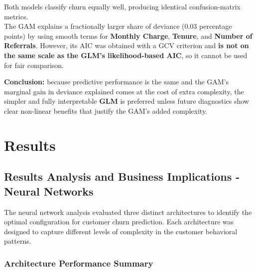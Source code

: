 \documentclass[
]{article}
\begin{document}
Both models classify churn equally well, producing identical
confusion-matrix metrics.\\
The GAM explains a fractionally larger share of deviance (0.03
percentage points) by using smooth terms for \textbf{Monthly Charge},
\textbf{Tenure}, and \textbf{Number of Referrals}. However, its AIC was
obtained with a GCV criterion and \textbf{is not on the same scale as
the GLM's likelihood-based AIC}, so it cannot be used for fair
comparison.

\textbf{Conclusion:} because predictive performance is the same and the
GAM's marginal gain in deviance explained comes at the cost of extra
complexity, the simpler and fully interpretable \textbf{GLM} is
preferred unless future diagnostics show clear non-linear benefits that
justify the GAM's added complexity.

\hypertarget{results}{%
\section{Results}\label{results}}

\hypertarget{results-analysis-and-business-implications---neural-networks}{%
\subsection{Results Analysis and Business Implications - Neural
Networks}\label{results-analysis-and-business-implications---neural-networks}}

The neural network analysis evaluated three distinct architectures to
identify the optimal configuration for customer churn prediction. Each
architecture was designed to capture different levels of complexity in
the customer behavioral patterns.

\hypertarget{architecture-performance-summary}{%
\subsubsection{Architecture Performance
Summary}\label{architecture-performance-summary}}
\end{document}
